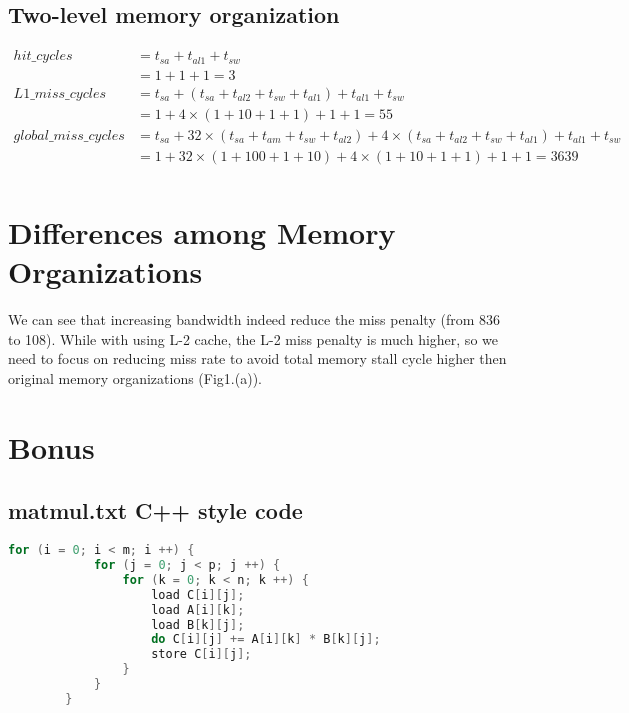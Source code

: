 \documentclass[12pt, a4paper]{article}
\begin{document}
\begin{CJK*}{UTF8}{bsmi}
        \subsection{Two-level memory organization}
            $
            \begin{aligned} 
            hit\_cycles         & = t_{sa} + t_{al1} + t_{sw} \\ 
                               & = 1 + 1 + 1 = 3 \\
            L1\_miss\_cycles     & = t_{sa} + (t_{sa} + t_{al2} + t_{sw} + t_{al1}) + t_{al1} + t_{sw} \\
                               & = 1 + 4 \times (1 + 10 + 1 + 1) + 1 + 1 = 55 \\
            global\_miss\_cycles & = t_{sa} + 32 \times (t_{sa} + t_{am} + t_{sw} + t_{al2}) + 4 \times (t_{sa} + t_{al2} + t_{sw} + t_{al1}) + t_{al1} + t_{sw} \\
                               & = 1 + 32 \times (1 + 100 + 1 + 10) + 4 \times (1 + 10 + 1 + 1) + 1 + 1 = 3639 \\
            \end{aligned} 
            $
    \newpage
    \section{Differences among Memory Organizations}
        We can see that increasing bandwidth indeed reduce the miss penalty (from 836 to 108).         While with using L-2 cache, the L-2 miss penalty is much higher, so we need to focus on reducing miss rate to avoid total memory stall cycle higher then original memory organizations (Fig1.(a)).

    \section{Bonus}
        \subsection{matmul.txt C++ style code} 
        \begin{lstlisting}[language=C++]
        for (i = 0; i < m; i ++) {
            for (j = 0; j < p; j ++) {
                for (k = 0; k < n; k ++) {
                    load C[i][j];
                    load A[i][k];
                    load B[k][j];
                    do C[i][j] += A[i][k] * B[k][j];
                    store C[i][j];
                }
            }
        }
        \end{lstlisting}


\end{CJK*}
\end{document}
